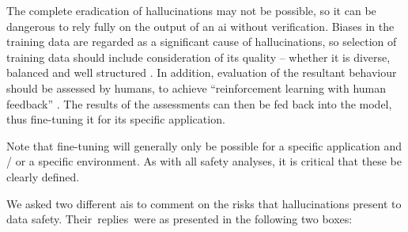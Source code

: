 The complete eradication of hallucinations may not be possible, so it can be dangerous to rely fully
on the output of an \gls{ai} without verification. Biases in the training data are regarded as a
significant cause of hallucinations, so selection of training data should include consideration
of its quality -- whether it is diverse, balanced and well structured
\cite{citation:halucinations:website}. In addition, evaluation of the resultant behaviour should be
assessed by humans, to achieve ``reinforcement learning with human feedback''
\cite{citation:howchatgptworks:website}.
The results of the assessments can then be fed back into the model,
thus fine-tuning it for its specific application.

Note that fine-tuning will generally only be possible for a specific application and / or a specific
environment. As with all safety analyses, it is critical that these be clearly defined.

We asked two different \glspl{ai} to comment on the risks that hallucinations present to data safety. Their\cbstart\ replies\cbend\ were as presented in the
following two boxes:

